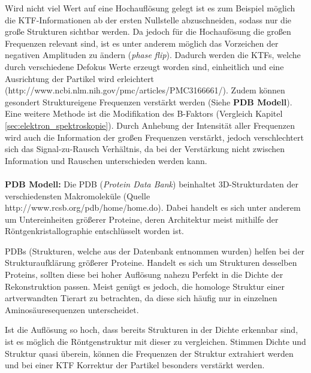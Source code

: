 Wird nicht viel Wert auf eine Hochauflösung gelegt ist es zum Beispiel möglich die KTF-Informationen ab der ersten Nullstelle abzuschneiden, sodass nur die große Strukturen sichtbar werden.
Da jedoch für die Hochaufösung die großen Frequenzen relevant sind, ist es unter anderem möglich das Vorzeichen der negativen Amplituden zu ändern (\textit{phase flip}).
Dadurch werden die KTFs, welche durch verschiedene Defokus Werte erzeugt worden sind, einheitlich und eine Ausrichtung der Partikel wird erleichtert (http://www.ncbi.nlm.nih.gov/pmc/articles/PMC3166661/).
Zudem können gesondert Struktureigene Frequenzen verstärkt werden (Siehe \textbf{PDB Modell}).
Eine weitere Methode ist die Modifikation des B-Faktors (Vergleich Kapitel \ref{sec:elektron_spektroskopie}).
Durch Anhebung der Intensität aller Frequenzen wird auch die Information der großen Frequenzen verstärkt, jedoch verschlechtert sich das Signal-zu-Rausch Verhältnis, da bei der Verstärkung nicht zwischen Information und Rauschen unterschieden werden kann.
\\
\\
\textbf{PDB Modell:}
Die PDB (\textit{Protein Data Bank}) beinhaltet 3D-Strukturdaten der verschiedensten Makromoleküle (Quelle http://www.rcsb.org/pdb/home/home.do).
Dabei handelt es sich unter anderem um Untereinheiten größerer Proteine, deren Architektur meist mithilfe der Röntgenkristallographie entschlüsselt worden ist.

PDBs (Strukturen, welche aus der Datenbank entnommen wurden) helfen bei der Strukturaufklärung größerer Proteine.
Handelt es sich um Strukturen desselben Proteins, sollten diese bei hoher Auflösung nahezu Perfekt in die Dichte der Rekonstruktion passen.
Meist genügt es jedoch, die homologe Struktur einer artverwandten Tierart zu betrachten, da diese sich häufig nur in einzelnen Aminosäuresequenzen unterscheidet.

Ist die Auflösung so hoch, dass bereits Strukturen in der Dichte erkennbar sind, ist es möglich die Röntgenstruktur mit dieser zu vergleichen.
Stimmen Dichte und Struktur quasi überein, können die Frequenzen der Struktur extrahiert werden und bei einer KTF Korrektur der Partikel besonders verstärkt werden.

\FloatBarrier